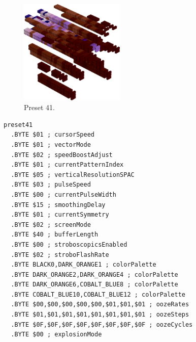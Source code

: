 \vspace*{-0.5cm}
\begin{minipage}[b]{0.48\linewidth}
\begin{figure}[H]                                                          
  \centering                                                             
  \begin{adjustbox}{width=5cm,center}                                   
  \includegraphics[width=5cm]{src/colorspace_presets/preset41-45.png}%
  \end{adjustbox}                                                        
\caption*{Preset 41.}                                           
\end{figure}                                                               
\end{minipage}
\hspace{0.1cm}
\begin{minipage}[b]{0.48\linewidth}                                                                         
\begin{lstlisting}[basicstyle=\ttfamily\tiny]
preset41
  .BYTE $01 ; cursorSpeed
  .BYTE $01 ; vectorMode
  .BYTE $02 ; speedBoostAdjust
  .BYTE $01 ; currentPatternIndex
  .BYTE $05 ; verticalResolutionSPAC
  .BYTE $03 ; pulseSpeed
  .BYTE $00 ; currentPulseWidth
  .BYTE $15 ; smoothingDelay
  .BYTE $01 ; currentSymmetry
  .BYTE $02 ; screenMode
  .BYTE $40 ; bufferLength
  .BYTE $00 ; stroboscopicsEnabled
  .BYTE $02 ; stroboFlashRate
  .BYTE BLACK0,DARK_ORANGE1 ; colorPalette
  .BYTE DARK_ORANGE2,DARK_ORANGE4 ; colorPalette
  .BYTE DARK_ORANGE6,COBALT_BLUE8 ; colorPalette
  .BYTE COBALT_BLUE10,COBALT_BLUE12 ; colorPalette
  .BYTE $00,$00,$00,$00,$00,$01,$01,$01 ; oozeRates
  .BYTE $01,$01,$01,$01,$01,$01,$01,$01 ; oozeSteps
  .BYTE $0F,$0F,$0F,$0F,$0F,$0F,$0F,$0F ; oozeCycles
  .BYTE $00 ; explosionMode
\end{lstlisting}
\end{minipage}


